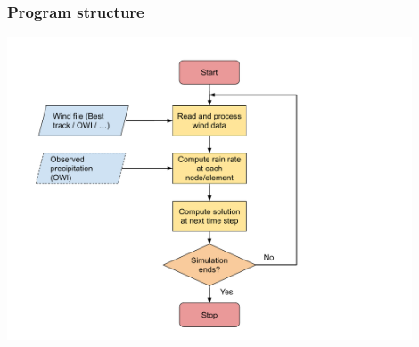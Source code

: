 \documentclass[10pt]{oden_beamer}
\begin{document}
\begin{frame}
  \frametitle{Program structure}
  \centering
  \includegraphics[width=0.9\textwidth]{flowchart.pdf}
\end{frame}
\end{document}
